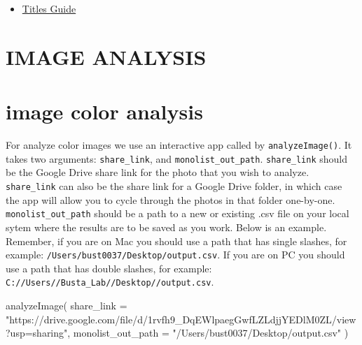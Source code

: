 \documentclass[
]{krantz}
\newenvironment{Shaded}{\begin{snugshade}}{\end{snugshade}}
\newcommand{\AttributeTok}[1]{\textcolor[rgb]{0.77,0.63,0.00}{#1}}
\newcommand{\FunctionTok}[1]{\textcolor[rgb]{0.00,0.00,0.00}{#1}}
\newcommand{\NormalTok}[1]{#1}
\newcommand{\StringTok}[1]{\textcolor[rgb]{0.31,0.60,0.02}{#1}}
\providecommand{\tightlist}{%
  \setlength{\itemsep}{0pt}\setlength{\parskip}{0pt}}
\begin{document}
\begin{itemize}
\tightlist
\item
  \href{https://libguides.usc.edu/writingguide/title}{Titles Guide}
\end{itemize}

\hypertarget{section-3}{%
\section*{}\label{section-3}}

\hypertarget{image-analysis}{%
\section*{IMAGE ANALYSIS}\label{image-analysis}}

\hypertarget{image-color-analysis}{%
\section{image color analysis}\label{image-color-analysis}}

For analyze color images we use an interactive app called by \texttt{analyzeImage()}. It takes two arguments: \texttt{share\_link}, and \texttt{monolist\_out\_path}. \texttt{share\_link} should be the Google Drive share link for the photo that you wish to analyze. \texttt{share\_link} can also be the share link for a Google Drive folder, in which case the app will allow you to cycle through the photos in that folder one-by-one. \texttt{monolist\_out\_path} should be a path to a new or existing .csv file on your local sytem where the results are to be saved as you work. Below is an example. Remember, if you are on Mac you should use a path that has single slashes, for example: \texttt{/Users/bust0037/Desktop/output.csv}. If you are on PC you should use a path that has double slashes, for example: \texttt{C://Users//Busta\_Lab//Desktop//output.csv}.

\begin{Shaded}
\begin{Highlighting}[]
\FunctionTok{analyzeImage}\NormalTok{(}
  \AttributeTok{share\_link =} \StringTok{"https://drive.google.com/file/d/1rvfh9\_DqEWlpaegGwfLZLdjjYEDlM0ZL/view?usp=sharing"}\NormalTok{,}
  \AttributeTok{monolist\_out\_path =} \StringTok{"/Users/bust0037/Desktop/output.csv"}
\NormalTok{)}
\end{Highlighting}
\end{Shaded}
\end{document}
